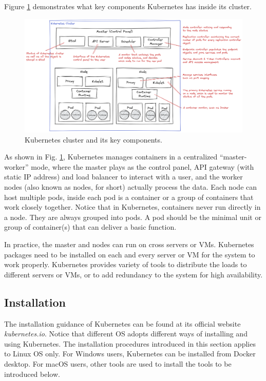 Figure \ref{ch:vac:fig:kubernetescluster} demonstrates what key components Kubernetes has inside its cluster.
\begin{figure}
	\centering
	\includegraphics[width=350pt]{chapters/ch-virtualization-and-containerization/figures/kubernetescluster.png}
	\caption{Kubernetes cluster and its key components.} \label{ch:vac:fig:kubernetescluster}
\end{figure}
As shown in Fig. \ref{ch:vac:fig:kubernetescluster}, Kubernetes manages containers in a centralized ``master-worker'' mode, where the master plays as the control panel, API gateway (with static IP address) and load balancer to interact with a user, and the worker nodes (also known as nodes, for short) actually process the data. Each node can host multiple pods, inside each pod is a container or a group of containers that work closely together. Notice that in Kubernetes, containers never run directly in a node. They are always grouped into pods. A pod should be the minimal unit or group of container(s) that can deliver a basic function.

In practice, the master and nodes can run on cross servers or VMs. Kubernetes packages need to be installed on each and every server or VM for the system to work properly. Kubernetes provides variety of tools to distribute the loads to different servers or VMs, or to add redundancy to the system for high availability.

\subsection{Installation}

The installation guidance of Kubernetes can be found at its official website \textit{kubernetes.io}. Notice that different OS adopts different ways of installing and using Kubernetes. The installation procedures introduced in this section applies to Linux OS only. For Windows users, Kubernetes can be installed from Docker desktop. For macOS users, other tools are used to install the tools to be introduced below.

